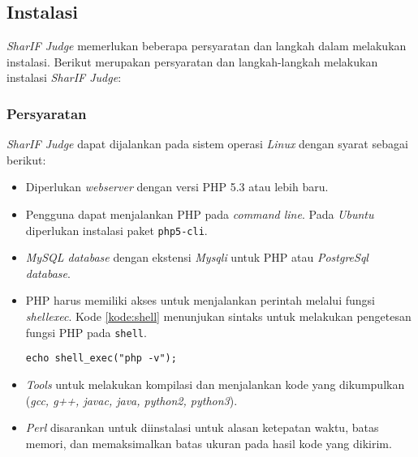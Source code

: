 \subsection{Instalasi}
\label{subsec:instalasi}

\textit{SharIF Judge} memerlukan beberapa persyaratan dan langkah dalam melakukan instalasi. Berikut merupakan persyaratan dan langkah-langkah melakukan instalasi \textit{SharIF Judge}:

\subsubsection{Persyaratan}
\label{subsubsec:persyaratan}
\textit{SharIF Judge} dapat dijalankan pada sistem operasi \textit{Linux} dengan syarat sebagai berikut:
\begin{itemize}
\item Diperlukan \textit{webserver} dengan versi PHP 5.3 atau lebih baru.
\item Pengguna dapat menjalankan PHP pada \textit{command line}. Pada \textit{Ubuntu} diperlukan instalasi paket \texttt{php5-cli}.
\item \textit{MySQL database} dengan ekstensi \textit{Mysqli} untuk PHP atau \textit{PostgreSql database}.
\item PHP harus memiliki akses untuk menjalankan perintah melalui fungsi \textit{shell\textunderscore exec}. Kode \ref{kode:shell} menunjukan sintaks untuk melakukan pengetesan fungsi PHP pada \texttt{shell}.

\begin{lstlisting}[caption=Kode untuk melakukah pengetesan fungsi, label=kode:shell]
	echo shell_exec("php -v");
\end{lstlisting}

\item \textit{Tools} untuk melakukan kompilasi dan menjalankan kode yang dikumpulkan (\textit{gcc, g++, javac, java, python2, python3}).
\item \textit{Perl} disarankan untuk diinstalasi untuk alasan ketepatan waktu, batas memori, dan memaksimalkan batas ukuran pada hasil kode yang dikirim.
\end{itemize}

